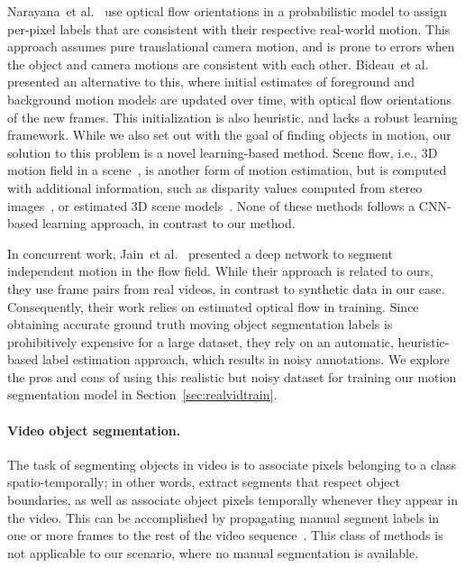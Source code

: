 Narayana~et al.~\cite{Narayana13} use optical flow orientations in a
probabilistic model to assign per-pixel labels that are consistent with their
respective real-world motion. This approach assumes pure translational camera
motion, and is prone to errors when the object and camera motions are
consistent with each other. Bideau~et al.~\cite{Bideau16} presented an
alternative to this, where initial estimates of foreground and background
motion models are updated over time, with optical flow orientations of the new
frames. This initialization is also heuristic, and lacks a robust learning
framework.  While we also set out with the goal of finding objects in motion, our
solution to this problem is a novel learning-based method. Scene flow, i.e., 3D
motion field in a scene~\cite{Vedula05}, is another form of motion estimation,
but is computed with additional information, such as disparity values computed
from stereo images~\cite{Huguet07,Wedel11}, or estimated 3D scene
models~\cite{Vogel15}. None of these methods follows a CNN-based learning
approach, in contrast to our method.

In concurrent work, Jain~et al.~\cite{jain2017fusionseg} presented a deep
network to segment independent motion in the flow field. While their approach
is related to ours, they use frame pairs from real videos, in contrast to
synthetic data in our case. Consequently, their work relies on estimated
optical flow in training. Since obtaining accurate ground truth moving object
segmentation labels is prohibitively expensive for a large dataset, they rely
on an automatic, heuristic-based label estimation approach, which results in
noisy annotations. We explore the pros and cons of using this realistic but
noisy dataset for training our motion segmentation model in
Section~\ref{sec:realvidtrain}.

\paragraph{\bf Video object segmentation.} The task of segmenting objects in
video is to associate pixels belonging to a class spatio-temporally; in other
words, extract segments that respect object boundaries, as well as associate
object pixels temporally whenever they appear in the video. This can be
accomplished by propagating manual segment labels in one or more frames to the
rest of the video sequence~\cite{Badrinarayanan10}. This class of methods is
not applicable to our scenario, where no manual segmentation is available.

